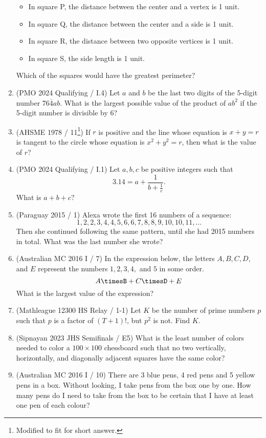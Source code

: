 \documentclass[a4paper]{article}
\begin{document}
\begin{enumerate}
\begin{itemize}
\item In square P, the distance between the center and a vertex is 1 unit.
\item In square Q, the distance between the center and a side is 1 unit.
\item In square R, the distance between two opposite vertices is 1 unit.
\item In square S, the side length is 1 unit.
\end{itemize}
Which of the squares would have the greatest perimeter?
\item (PMO 2024 Qualifying / I.4) Let $a$ and $b$ be the last two digits of the 5-digit number $\overline{764ab}$. What is the largest possible value of the product of $ab^2$ if the 5-digit number is divisible by 6?
\item (AHSME 1978 / 11\footnote{Modified to fit for short answer.}) If $r$ is positive and the line whose equation is $x + y = r$ is tangent to the circle whose equation is $x^2 + y ^2 = r$, then what is the value of $r$?
\item (PMO 2024 Qualifying / I.1) Let $a,b,c$ be positive integers such that $$3.14=a+\frac1{b+\frac1c}.$$ What is $a+b+c?$
\item (Paraguay 2015 / 1) Alexa wrote the first 16 numbers of a sequence: \begin{equation*}1, 2, 2, 3, 4, 4, 5, 6, 6, 7, 8, 8, 9, 10, 10, 11, \dots\end{equation*} Then she continued following the same pattern, until she had 2015 numbers in total. What was the last number she wrote?
\item (Australian MC 2016 I / 7) In the expression below, the letters $A,B,C,D,$ and $E$ represent the numbers $1,2,3,4,$ and $5$ in some order. $$A\timesB+C\timesD+E$$ What is the largest value of the expression?
\item (Mathleague 12300 HS Relay / 1-1) Let $K$ be the number of prime numbers $p$ such that $p$ is a factor of $(T+1)!$, but $p^2$ is not. Find $K$.
\item (Sipnayan 2023 JHS Semifinals / E5) What is the least number of colors needed to color a $100\times100$ chessboard such that no two vertically, horizontally, and diagonally adjacent squares have the same color?
\item (Australian MC 2016 I / 10) There are 3 blue pens, 4 red pens and 5 yellow pens in a box. Without looking, I take pens from the box one by one. How many pens do I need to take from the box to be certain that I have at least one pen of each colour?

\end{enumerate}
\end{document}
